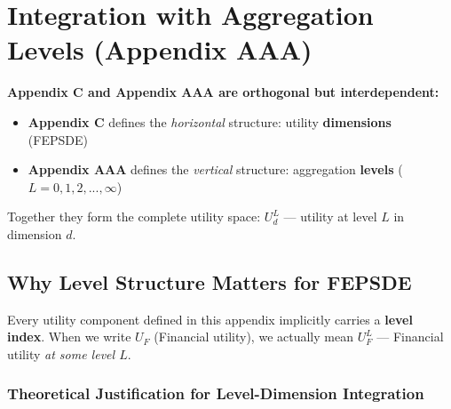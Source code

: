 \section{Integration with Aggregation Levels (Appendix AAA)}
\label{sec:app-c-aaa-integration}

\begin{tcolorbox}[colback=blue!5!white, colframe=blue!75!black, 
    title=Critical Integration: Appendix C $\times$ Appendix AAA]
\textbf{Appendix C and Appendix AAA are orthogonal but interdependent:}
\begin{itemize}[nosep]
\item \textbf{Appendix C} defines the \textit{horizontal} structure: utility \textbf{dimensions} (FEPSDE)
\item \textbf{Appendix AAA} defines the \textit{vertical} structure: aggregation \textbf{levels} ($L = 0, 1, 2, ..., \infty$)
\end{itemize}

Together they form the complete utility space: $U^L_d$ --- utility at level $L$ in dimension $d$.
\end{tcolorbox}

\subsection{Why Level Structure Matters for FEPSDE}

Every utility component defined in this appendix implicitly carries a \textbf{level index}. 
When we write $U_F$ (Financial utility), we actually mean $U^L_F$ --- Financial utility 
\textit{at some level $L$}.

\subsubsection{Theoretical Justification for Level-Dimension Integration}

